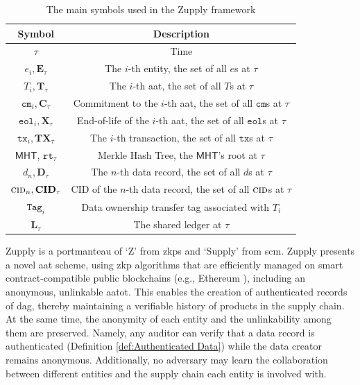 \begin{table}[h]
    \centering
        \caption{The main symbols used in the Zupply framework}
    \begin{tabular}{c c}
    \hline 
        \textbf{Symbol} & \textbf{Description} \\
    \hline 
        $\tau$ & Time \\
        $e_i, \mathbf{E}_\tau$ & The $i$-th entity, the set of all $e$s at  $\tau$  \\
        $T_i, \mathbf{T}_\tau$ & The $i$-th \gls{aat}, the set of all $T$s at  $\tau$  \\
        $\texttt{cm}_i, \mathbf{C}_\tau$ & Commitment to the $i$-th \gls{aat}, the set of all $\texttt{cm}$s at $\tau$\\
        $\texttt{eol}_i, \mathbf{X}_\tau$ & End-of-life of the $i$-th \gls{aat}, the set of all $\texttt{eol}$s at $\tau$\\
        $\texttt{tx}_i, \mathbf{TX}_\tau$ & The $i$-th transaction, the set of all $\texttt{tx}$s at $\tau$\\
        $\mathsf{MHT}$, $\texttt{rt}_\tau$ & Merkle Hash Tree, the $\mathsf{MHT}$'s root at  $\tau$\\
        $d_n, \mathbf{D}_\tau$ & The $n$-th data record, the set of all $d$s at $\tau$ \\
        $\textsc{cid}_n, \mathbf{CID}_\tau$ & CID of the $n$-th data record, the set of all  $\textsc{cid}$s at $\tau$\\
        $\texttt{Tag}_i$ & Data ownership transfer tag associated with $T_i$\\
        $\mathbf{L}_\tau$ & The shared ledger at $\tau$ \\
    \hline 
    \end{tabular}
    \label{tab:Zupply-Symbols}
\end{table}

Zupply is a portmanteau of `Z' from \gls{zkp}s \cite{Goldwasser1985} and `Supply' from \gls{scm}. 
Zupply presents a novel \gls{aat} scheme, using \gls{zkp} algorithms that are efficiently managed on smart contract-compatible public blockchains (e.g., Ethereum \cite{ethereum}), including an anonymous, unlinkable \gls{aatot}. This enables the creation of authenticated records of \gls{dag}, thereby maintaining a verifiable history of products in the supply chain. At the same time, the anonymity of each entity and the unlinkability among them are preserved. Namely, any auditor can verify that a data record is authenticated (Definition \ref{def:Authenticated Data}) while the data creator remains anonymous. Additionally, no adversary may learn the collaboration between different entities and the supply chain each entity is involved with. 

